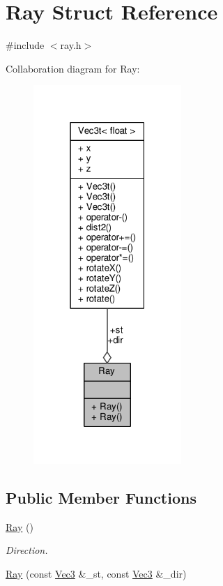 \hypertarget{structRay}{}\section{Ray Struct Reference}
\label{structRay}


{\ttfamily \#include $<$ray.\+h$>$}



Collaboration diagram for Ray\+:
\nopagebreak
\begin{figure}[H]
\begin{center}
\leavevmode
\includegraphics[width=159pt]{structRay__coll__graph}
\end{center}
\end{figure}
\subsection*{Public Member Functions}
\begin{DoxyCompactItemize}
\item 
\hyperlink{structRay_a2e3d2c29f2df4ab3da10da79d4acb852}{Ray} ()
\begin{DoxyCompactList}\small\item\em Direction. \end{DoxyCompactList}\item 
\hyperlink{structRay_a8cf3788de5062520f18684918b0347d8}{Ray} (const \hyperlink{vec_8h_ae4fcaa7c0a3935930ed1be5f70b90373}{Vec3} \&\+\_\+st, const \hyperlink{vec_8h_ae4fcaa7c0a3935930ed1be5f70b90373}{Vec3} \&\+\_\+dir)
\end{DoxyCompactItemize}
